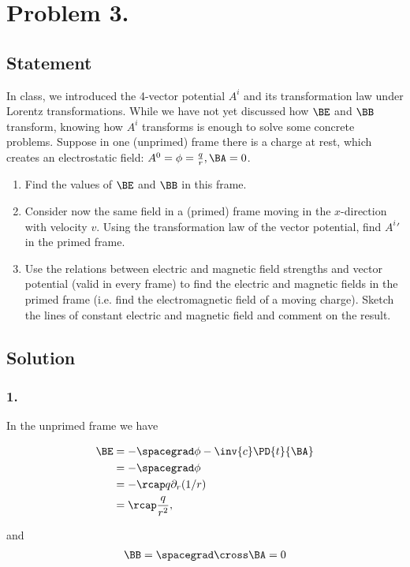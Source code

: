 \section{Problem 3.}
\subsection{Statement}

In class, we introduced the 4-vector potential $A^i$ and its transformation law under Lorentz transformations.  While we have not yet discussed how $\BE$ and $\BB$ transform, knowing how $A^i$ transforms is enough to solve some concrete problems.  Suppose in one (unprimed) frame there is a charge at rest, which creates an electrostatic field: $A^0 = \phi = \frac{q}{r}, \BA = 0$.

\begin{enumerate}
\item Find the values of $\BE$ and $\BB$ in this frame.
\item Consider now the same field in a (primed) frame moving in the $x$-direction with velocity $v$.  Using the transformation law of the vector potential, find ${A^i}'$ in the primed frame.
\item Use the relations between electric and magnetic field strengths and vector potential (valid in every frame) to find the electric and magnetic fields in the primed frame (i.e. find the electromagnetic field of a moving charge).  Sketch the lines of constant electric and magnetic field and comment on the result.
\end{enumerate}

\subsection{Solution}
\subsubsection{1.}

In the unprimed frame we have

\begin{align*}
\BE 
&= - \spacegrad \phi - \inv{c} \PD{t}{\BA} \\
&= -\spacegrad \phi \\
&= - \rcap q \partial_r (1/r) \\
&= \rcap \frac{q}{r^2},
\end{align*}

and
\begin{align*}
\BB = \spacegrad \cross \BA = 0
\end{align*}


